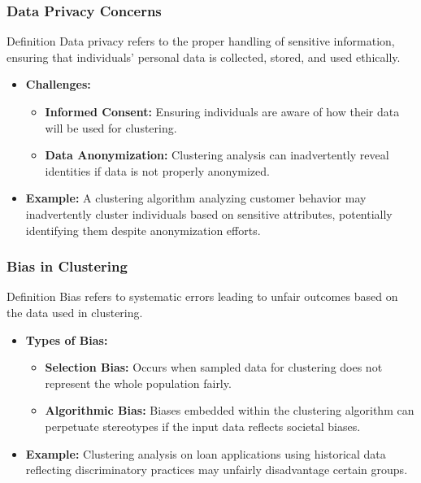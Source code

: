 \documentclass[aspectratio=169]{beamer}
\begin{document}
\begin{frame}[fragile]
    \frametitle{Data Privacy Concerns}
    \begin{block}{Definition}
        Data privacy refers to the proper handling of sensitive information, ensuring that individuals' personal data is collected, stored, and used ethically.
    \end{block}
    \begin{itemize}
        \item \textbf{Challenges:}
        \begin{itemize}
            \item \textbf{Informed Consent:} Ensuring individuals are aware of how their data will be used for clustering.
            \item \textbf{Data Anonymization:} Clustering analysis can inadvertently reveal identities if data is not properly anonymized.
        \end{itemize}
        \item \textbf{Example:} A clustering algorithm analyzing customer behavior may inadvertently cluster individuals based on sensitive attributes, potentially identifying them despite anonymization efforts.
    \end{itemize}
\end{frame}

\begin{frame}[fragile]
    \frametitle{Bias in Clustering}
    \begin{block}{Definition}
        Bias refers to systematic errors leading to unfair outcomes based on the data used in clustering.
    \end{block}
    \begin{itemize}
        \item \textbf{Types of Bias:}
        \begin{itemize}
            \item \textbf{Selection Bias:} Occurs when sampled data for clustering does not represent the whole population fairly.
            \item \textbf{Algorithmic Bias:} Biases embedded within the clustering algorithm can perpetuate stereotypes if the input data reflects societal biases.
        \end{itemize}
        \item \textbf{Example:} Clustering analysis on loan applications using historical data reflecting discriminatory practices may unfairly disadvantage certain groups.
    \end{itemize}
\end{frame}
\end{document}
